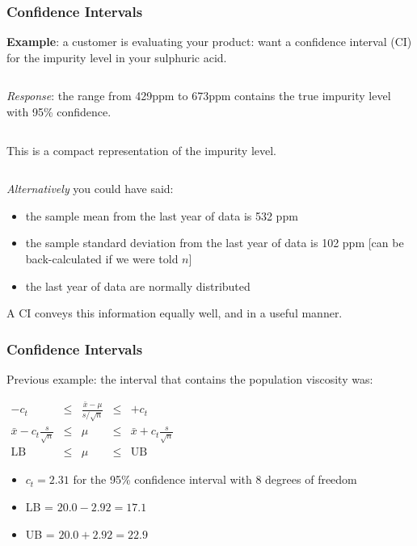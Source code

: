 \begin{frame}\frametitle{Confidence Intervals}

	\textbf{Example}: a customer is evaluating your product: want a confidence interval (CI) for the impurity level in your sulphuric acid.

	$\qquad$

	\emph{Response}: the range from 429ppm to 673ppm contains the true impurity level with 95\% confidence.

	$\qquad$

	This is a compact representation of the impurity level.

	$\qquad$

	\emph{Alternatively} you could have said:
	\begin{itemize}
		\item	the sample mean from the last year of data is 532 ppm
		\item	the sample standard deviation from the last year of data is 102 ppm [can be back-calculated if we were told $n$]
		\item	the last year of data are normally distributed
	\end{itemize}

	A CI conveys this information equally well, and in a useful manner.
\end{frame}

\begin{frame}\frametitle{Confidence Intervals}

	Previous example: the interval that contains the population viscosity was:

	$
	\begin{array}{rcccl}
		- c_t &\leq& \displaystyle \frac{\bar{x} - \mu}{s/\sqrt{n}} &\leq& +c_t\\
		\bar{x} - c_t \displaystyle \frac{s}{\sqrt{n}} &\leq& \mu &\leq& \bar{x} + c_t\displaystyle\frac{s}{\sqrt{n}} \\
		\text{LB} &\leq& \mu &\leq& \text{UB}
	\end{array}
	$
	\begin{itemize}
		\item	$c_t = 2.31$ for the 95\% confidence interval with 8 degrees of freedom
		\item	LB = $20.0 - 2.92 = 17.1$
		\item	UB = $20.0 + 2.92 = 22.9$
	\end{itemize}
\end{frame}

